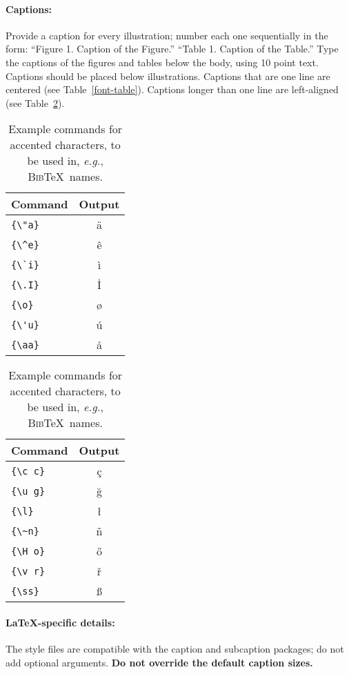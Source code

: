 \documentclass[11pt,a4paper]{article}
\newcommand\BibTeX{B\textsc{ib}\TeX}
\begin{document}
\paragraph{Captions:}
Provide a caption for every illustration; number each one sequentially in the form:
``Figure 1. Caption of the Figure.''
``Table 1. Caption of the Table.''
Type the captions of the figures and tables below the body, using 10 point text.
Captions should be placed below illustrations.
Captions that are one line are centered (see Table~\ref{font-table}).
Captions longer than one line are left-aligned (see Table~\ref{tab:accents}).

\begin{table}
\centering
\begin{tabular}{lc}
\hline
\textbf{Command} & \textbf{Output}\\
\hline
\verb|{\"a}| & {\"a} \\
\verb|{\^e}| & {\^e} \\
\verb|{\`i}| & {\`i} \\ 
\verb|{\.I}| & {\.I} \\ 
\verb|{\o}| & {\o} \\
\verb|{\'u}| & {\'u}  \\ 
\verb|{\aa}| & {\aa}  \\\hline
\end{tabular}
\begin{tabular}{lc}
\hline
\textbf{Command} & \textbf{Output}\\
\hline
\verb|{\c c}| & {\c c} \\ 
\verb|{\u g}| & {\u g} \\ 
\verb|{\l}| & {\l} \\ 
\verb|{\~n}| & {\~n} \\ 
\verb|{\H o}| & {\H o} \\ 
\verb|{\v r}| & {\v r} \\ 
\verb|{\ss}| & {\ss} \\
\hline
\end{tabular}
\caption{Example commands for accented characters, to be used in, \emph{e.g.}, \BibTeX\ names.}\label{tab:accents}
\end{table}

\paragraph{\LaTeX-specific details:}
The style files are compatible with the caption and subcaption packages; do not add optional arguments.
\textbf{Do not override the default caption sizes.}
\end{document}
